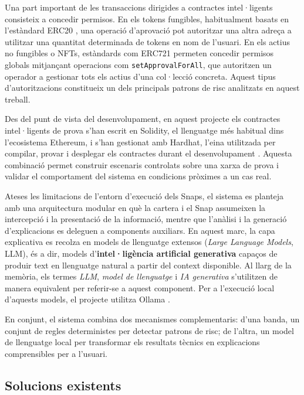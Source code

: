 Una part important de les transaccions dirigides a contractes intel·ligents consisteix a concedir permisos. En els tokens fungibles, habitualment basats en l’estàndard ERC20 \cite{eip20}, una operació d’aprovació pot autoritzar una altra adreça a utilitzar una quantitat determinada de tokens en nom de l’usuari. En els actius no fungibles o NFTs, estàndards com ERC721 \cite{eip721} permeten concedir permisos globals mitjançant operacions com \texttt{setApprovalForAll}, que autoritzen un operador a gestionar tots els actius d’una col·lecció concreta. Aquest tipus d’autoritzacions constitueix un dels principals patrons de risc analitzats en aquest treball.


Des del punt de vista del desenvolupament, en aquest projecte els contractes intel·ligents de prova s’han escrit en Solidity, el llenguatge més habitual dins l’ecosistema Ethereum, i s’han gestionat amb Hardhat, l’eina utilitzada per compilar, provar i desplegar els contractes durant el desenvolupament \cite{solidity_docs,hardhat_docs}. Aquesta combinació permet construir escenaris controlats sobre una xarxa de prova i validar el comportament del sistema en condicions pròximes a un cas real.

Ateses les limitacions de l’entorn d’execució dels Snaps, el sistema es planteja amb una arquitectura modular en què la cartera i el Snap assumeixen la intercepció i la presentació de la informació, mentre que l’anàlisi i la generació d’explicacions es deleguen a components auxiliars. En aquest marc, la capa explicativa es recolza en models de llenguatge extensos (\textit{Large Language Models}, LLM), és a dir, models d’\textbf{intel·ligència artificial generativa} capaços de produir text en llenguatge natural a partir del context disponible. Al llarg de la memòria, els termes \textit{LLM}, \textit{model de llenguatge} i \textit{IA generativa} s’utilitzen de manera equivalent per referir-se a aquest component. Per a l’execució local d’aquests models, el projecte utilitza Ollama \cite{ollama_api_intro,ollama_auth_local}.

En conjunt, el sistema combina dos mecanismes complementaris: d’una banda, un conjunt de regles deterministes per detectar patrons de risc; de l’altra, un model de llenguatge local per transformar els resultats tècnics en explicacions comprensibles per a l’usuari.

\subsection{Solucions existents}

